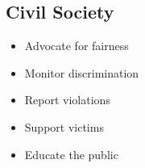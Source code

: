 \subsection{Civil Society}

\begin{itemize}
    \item Advocate for fairness
    \item Monitor discrimination
    \item Report violations
    \item Support victims
    \item Educate the public
\end{itemize}

\cleardoublepage
